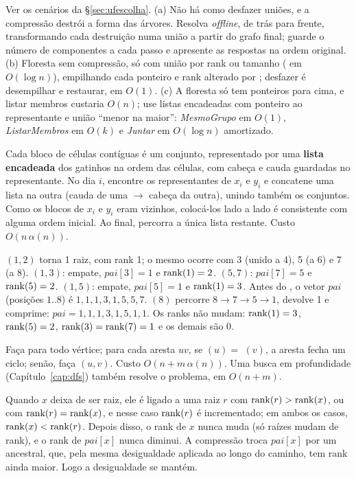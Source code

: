  Ver os cenários da §\ref{sec:ufescolha}. (a) Não há como desfazer uniões, e a compressão destrói a forma das árvores. Resolva \emph{offline}, de trás para frente, transformando cada destruição numa união a partir do grafo final; guarde o número de componentes a cada passo e apresente as respostas na ordem original. (b) Floresta sem compressão, só com união por rank ou tamanho (\Find{} em $O(\log n)$), empilhando cada ponteiro e rank alterado por \Union; desfazer é desempilhar e restaurar, em $O(1)$. (c) A floresta só tem ponteiros para cima, e listar membros custaria $O(n)$; use listas encadeadas com ponteiro ao representante e união ``menor na maior'': \emph{MesmoGrupo} em $O(1)$, \emph{ListarMembros} em $O(k)$ e \emph{Juntar} em $O(\log n)$ amortizado.

 Cada bloco de células contíguas é um conjunto, representado por uma \textbf{lista encadeada} dos gatinhos na ordem das células, com cabeça e cauda guardadas no representante. No dia $i$, encontre os representantes de $x_i$ e $y_i$ e concatene uma lista na outra (cauda de uma $\to$ cabeça da outra), unindo também os conjuntos. Como os blocos de $x_i$ e $y_i$ eram vizinhos, colocá-los lado a lado é consistente com alguma ordem inicial. Ao final, percorra a única lista restante. Custo $O(n\,\alpha(n))$.

 \Union$(1,2)$ torna 1 raiz, com rank 1; o mesmo ocorre com 3 (unido a 4), 5 (a 6) e 7 (a 8). \Union$(1,3)$: empate, $pai[3]=1$ e $\operatorname{rank}(1)=2$. \Union$(5,7)$: $pai[7]=5$ e $\operatorname{rank}(5)=2$. \Union$(1,5)$: empate, $pai[5]=1$ e $\operatorname{rank}(1)=3$. Antes do \Find, o vetor $pai$ (posições $1..8$) é $1,1,1,3,1,5,5,7$. \Find$(8)$ percorre $8\to7\to5\to1$, devolve 1 e comprime: $pai=1,1,1,3,1,5,1,1$. Os ranks não mudam: $\operatorname{rank}(1)=3$, $\operatorname{rank}(5)=2$, $\operatorname{rank}(3)=\operatorname{rank}(7)=1$ e os demais são 0.

 Faça \MakeSet{} para todo vértice; para cada aresta $uv$, se \Find$(u)=$ \Find$(v)$, a aresta fecha um ciclo; senão, faça \Union$(u,v)$. Custo $O(n+m\,\alpha(n))$. Uma busca em profundidade (Capítulo~\ref{cap:dfs}) também resolve o problema, em $O(n+m)$.

 Quando $x$ deixa de ser raiz, ele é ligado a uma raiz $r$ com $\operatorname{rank}(r)>\operatorname{rank}(x)$, ou com $\operatorname{rank}(r)=\operatorname{rank}(x)$, e nesse caso $\operatorname{rank}(r)$ é incrementado; em ambos os casos, $\operatorname{rank}(x)<\operatorname{rank}(r)$. Depois disso, o rank de $x$ nunca muda (só raízes mudam de rank), e o rank de $pai[x]$ nunca diminui. A compressão troca $pai[x]$ por um ancestral, que, pela mesma desigualdade aplicada ao longo do caminho, tem rank ainda maior. Logo a desigualdade se mantém.

